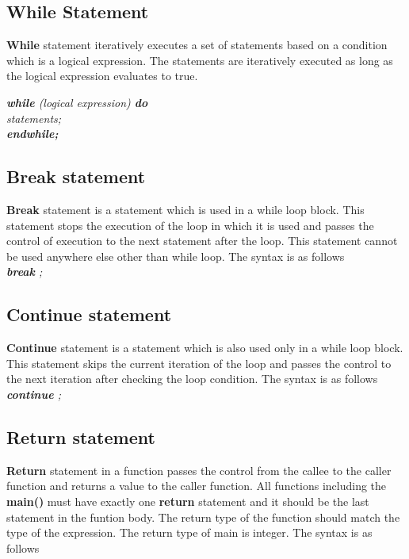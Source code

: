 \documentclass[11pt]{article}
\begin{document}
\subsection{While Statement}
\textbf{While} statement iteratively executes a set of statements based on a condition which is a logical expression.  The statements are iteratively executed as long as the logical expression evaluates to true.

\textit{
\textbf{while} (logical expression) \textbf{do}  \\
 \indent \indent statements; \\
\indent \textbf{endwhile;}  \\
}

\subsection{Break statement}
\textbf{Break} statement is a statement which is used in a while loop block. This statement stops the execution of the loop in which it is used and passes the control of execution to the next statement after the loop. This statement cannot be used anywhere else other than while loop. The syntax is as follows\\

\textit{\textbf{break} ;}

\subsection{Continue statement}
\textbf{Continue} statement is a statement which is also used only in a while loop block. This statement skips the current iteration of the loop and passes the control to the next iteration after checking the loop condition. The syntax is as follows\\

\textit{\textbf{continue} ;}



\subsection{Return statement}
\textbf{Return} statement in a function passes the control from the callee to the caller function and returns a value to the caller function. All functions including the \textbf{main()} must have exactly one \textbf{return} statement and it should be the last statement in the funtion body. The return type of the function should match the type of the expression. The return type of main is integer. The syntax is as follows\\
\end{document}
